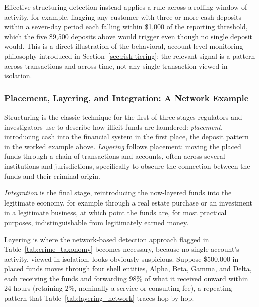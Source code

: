 \documentclass[../ai_in_finance]{subfiles}
\begin{document}
Effective structuring detection instead applies a rule across a rolling window of activity, for example, flagging any customer with three or more cash deposits within a seven-day period each falling within \$1,000 of the reporting threshold, which the five \$9,500 deposits above would trigger even though no single deposit would. This is a direct illustration of the behavioral, account-level monitoring philosophy introduced in Section~\ref{sec:risk-tiering}: the relevant signal is a pattern across transactions and across time, not any single transaction viewed in isolation.

\subsubsection*{Placement, Layering, and Integration: A Network Example}

Structuring is the classic technique for the first of three stages regulators and investigators use to describe how illicit funds are laundered: \emph{placement}, introducing cash into the financial system in the first place, the deposit pattern in the worked example above. \emph{Layering} follows placement: moving the placed funds through a chain of transactions and accounts, often across several institutions and jurisdictions, specifically to obscure the connection between the funds and their criminal origin.

\emph{Integration} is the final stage, reintroducing the now-layered funds into the legitimate economy, for example through a real estate purchase or an investment in a legitimate business, at which point the funds are, for most practical purposes, indistinguishable from legitimately earned money.

Layering is where the network-based detection approach flagged in Table~\ref{tab:crime_taxonomy} becomes necessary, because no single account's activity, viewed in isolation, looks obviously suspicious. Suppose \$500,000 in placed funds moves through four shell entities, Alpha, Beta, Gamma, and Delta, each receiving the funds and forwarding $98\%$ of what it received onward within 24 hours (retaining $2\%$, nominally a service or consulting fee), a repeating pattern that Table~\ref{tab:layering_network} traces hop by hop.
\end{document}
